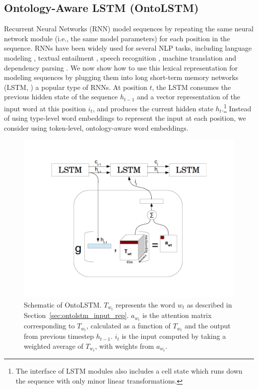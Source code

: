 \subsection{Ontology-Aware LSTM (OntoLSTM)}
\label{sec:ontolstm}
Recurrent Neural Networks (RNN) model sequences by repeating the same neural network module (i.e., the same model parameters) for each position in the sequence.
RNNs have been widely used for several NLP tasks, including language modeling \citep{mikolov:10}, textual entailment \citep{bowman:15}, speech recognition \citep{graves:13}, machine translation \citep{sutskever:14} and dependency parsing \citep{dyer:15}.
We now show how to use this lexical representation for modeling sequences by plugging them into long short-term memory networks  (LSTM, \cite{hochreiter1997long}) a popular type of RNNs.
At position $t$, the LSTM consumes the previous hidden state of the sequence $h_{t-1}$ and a vector representation of the input word at this position $i_t$, and produces the current hidden state $h_t$.\footnote{The interface of LSTM modules also includes a cell state which runs down the sequence with only minor linear transformations.}
Instead of using type-level word embeddings to represent the input at each position, we consider using token-level, ontology-aware word embeddings.
\begin{figure}
  \begin{center}
  \includegraphics[width=5in]{figures/ontolstm_diagram_modified.png}
  \caption{Schematic of OntoLSTM. $T_{w_t}$ represents the word $w_t$ as described in Section~\ref{sec:ontolstm_input_rep}. $a_{w_t}$ is the attention matrix corresponding to $T_{w_t}$, calculated as a function of $T_{w_t}$ and the output from previous
  timestep $h_{t-1}$. $i_t$ is the input computed by taking a weighted average of $T_{w_t}$, with weights from $a_{w_t}$.}
  \label{fig:ontolstm_model}
  \end{center}
 \end{figure}

